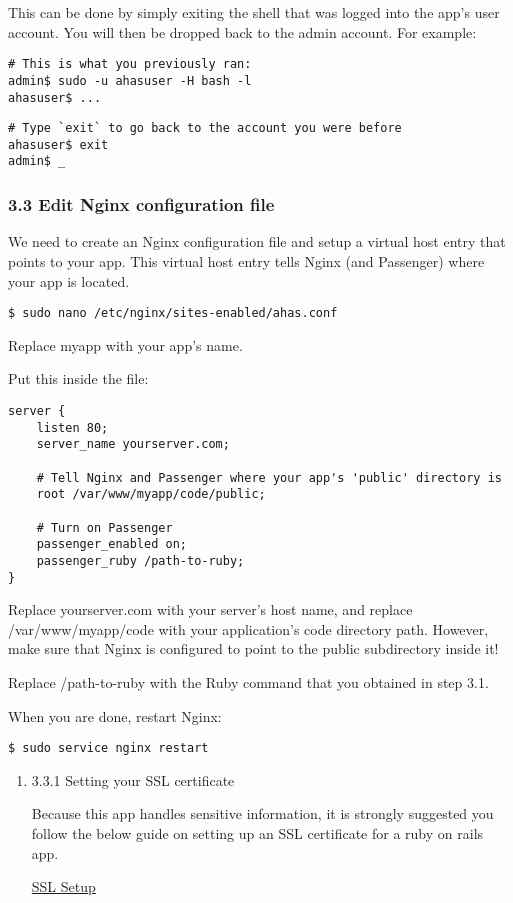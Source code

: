 \documentclass[11pt]{article}
\begin{document}
This can be done by simply exiting the shell that was logged into the app's user account. You will then be dropped back to the admin account. For example:

\begin{verbatim}
# This is what you previously ran:
admin$ sudo -u ahasuser -H bash -l
ahasuser$ ...
\end{verbatim}

\begin{verbatim}
# Type `exit` to go back to the account you were before
ahasuser$ exit
admin$ _
\end{verbatim}

\subsubsection{3.3 Edit Nginx configuration file}
\label{sec:orga0be4c5}

We need to create an Nginx configuration file and setup a virtual host entry that points to your app. This virtual host entry tells Nginx (and Passenger) where your app is located.
\begin{verbatim}
$ sudo nano /etc/nginx/sites-enabled/ahas.conf
\end{verbatim}
Replace myapp with your app's name.

Put this inside the file:
\begin{verbatim}
server {
    listen 80;
    server_name yourserver.com;

    # Tell Nginx and Passenger where your app's 'public' directory is
    root /var/www/myapp/code/public;

    # Turn on Passenger
    passenger_enabled on;
    passenger_ruby /path-to-ruby;
}
\end{verbatim}
Replace yourserver.com with your server's host name, and replace /var/www/myapp/code with your application's code directory path. However, make sure that Nginx is configured to point to the public subdirectory inside it!

Replace /path-to-ruby with the Ruby command that you obtained in step 3.1.

When you are done, restart Nginx:

\begin{verbatim}
$ sudo service nginx restart
\end{verbatim}

\begin{enumerate}
\item 3.3.1 Setting your SSL certificate
\label{sec:orge794427}

Because this app handles sensitive information, it is strongly suggested you follow the below guide on setting up an SSL certificate for a ruby on rails app.

\href{https://www.pluralsight.com/guides/ruby-ruby-on-rails/using-https-with-ruby-on-rails}{SSL Setup}
\end{enumerate}
\end{document}
